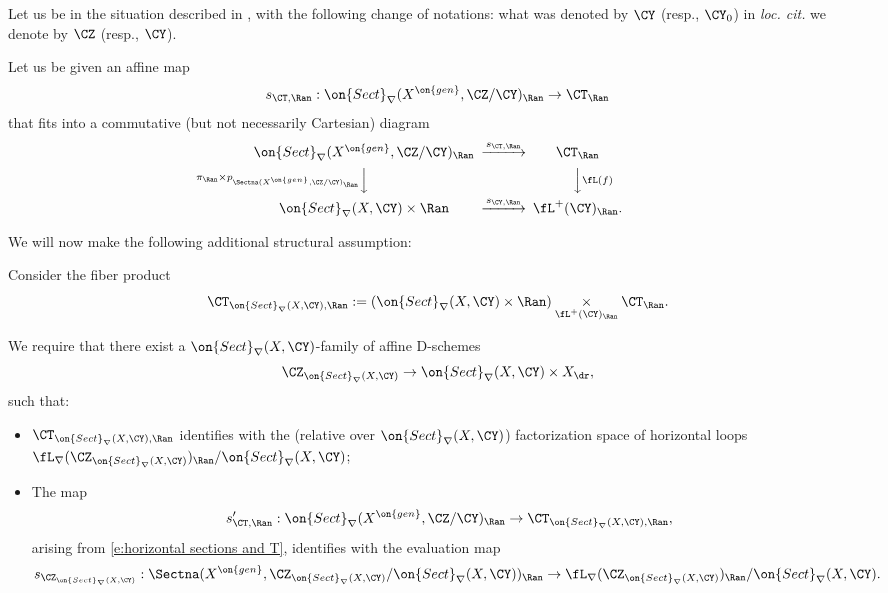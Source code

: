 \documentclass[9pt]{amsart}
\theoremstyle{remark}
\theoremstyle{definition}
\theoremstyle{remark}
\numberwithin{equation}{section}
\begin{document}
\sssec{}

Let us be in the situation described in \cite[Sects. 4.5.1-4.5.2.]{GLC2}, with the following change of notations:
what was denoted by $\CY$ (resp., $\CY_0$) in {\it loc. cit.} we denote by $\CZ$ (resp., $\CY$). 

\medskip

Let us be given an affine map
$$s_{\CT,\Ran}:\on{Sect}_\nabla(X^{\on{gen}},\CZ/\CY)_\Ran\to \CT_\Ran$$
that fits into a commutative (but not necessarily Cartesian) diagram
\begin{equation} \label{e:horizontal sections and T}
\CD
\on{Sect}_\nabla(X^{\on{gen}},\CZ/\CY)_\Ran @>{s_{\CT,\Ran}}>>   \CT_\Ran \\
@V{\pi_\Ran\times p_{\Sectna(X^{\on{gen}},\CZ/\CY)_\Ran}}VV @VV{\fL(f)}V  \\
\on{Sect}_\nabla(X,\CY)\times \Ran @>{s_{\CY,\Ran}}>> \fL^+(\CY)_\Ran. 
\endCD
\end{equation} 

\sssec{} \label{sss:param vers}

We will now make the following additional structural assumption:

\medskip

Consider the fiber product 
$$\CT_{\on{Sect}_\nabla(X,\CY),\Ran}:=(\on{Sect}_\nabla(X,\CY)\times \Ran)\underset{\fL^+(\CY)_\Ran}\times \CT_\Ran.$$

We require that there exist a $\on{Sect}_\nabla(X,\CY)$-family of affine D-schemes 
$$\CZ_{\on{Sect}_\nabla(X,\CY)}\to \on{Sect}_\nabla(X,\CY)\times X_\dr,$$
such that:

\begin{itemize}

\item $\CT_{\on{Sect}_\nabla(X,\CY),\Ran}$ identifies with the (relative over $\on{Sect}_\nabla(X,\CY)$) factorization space of 
horizontal loops 
$\fL_\nabla(\CZ_{\on{Sect}_\nabla(X,\CY)})_\Ran/\on{Sect}_\nabla(X,\CY)$;

\medskip

\item The map 
$$s'_{\CT,\Ran}: \on{Sect}_\nabla(X^{\on{gen}},\CZ/\CY)_\Ran\to \CT_{\on{Sect}_\nabla(X,\CY),\Ran},$$
arising from \eqref{e:horizontal sections and T}, identifies with the evaluation map
$$s_{\CZ_{\on{Sect}_\nabla(X,\CY)}}:
\Sectna(X^{\on{gen}},\CZ_{\on{Sect}_\nabla(X,\CY)}/\on{Sect}_\nabla(X,\CY))_\Ran\to \fL_\nabla(\CZ_{\on{Sect}_\nabla(X,\CY)})_\Ran/\on{Sect}_\nabla(X,\CY).$$

\end{itemize} 
\end{document}
